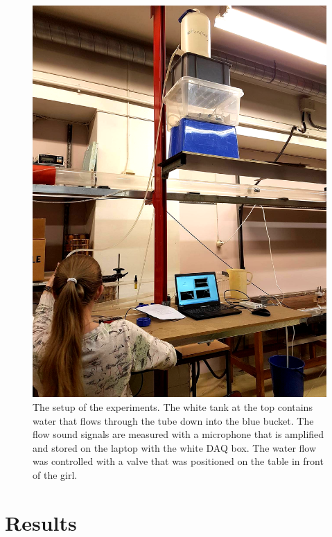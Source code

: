 \documentclass[english,a4paper,12pt]{article}
\begin{document}
\begin{figure}[H]
    \centering
    \includegraphics[width=150mm]{ExperimentSetup.png}
    \caption{The setup of the experiments. The white tank at the top contains water that flows through the tube down into the blue bucket. The flow sound signals are measured with a microphone that is amplified and stored on the laptop with the white DAQ box. The water flow was controlled with a valve that was positioned on the table in front of the girl.}
    \label{fig:1}
\end{figure}

\section*{Results}
\end{document}
